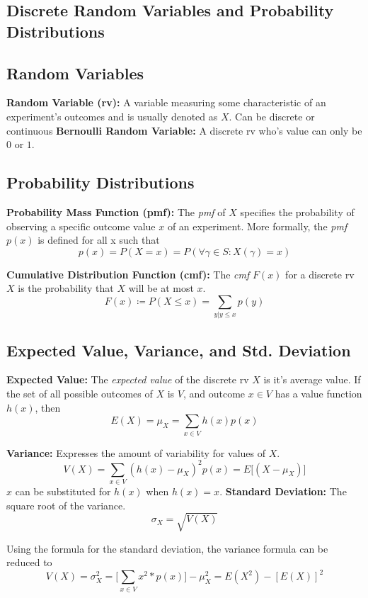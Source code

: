 \documentclass[10pt,twoside,a4paper]{article}
\begin{document}
\begin{multicols*}{2}
\begin{flushleft}
	\section{Discrete Random Variables and Probability Distributions}

	\subsection{Random Variables}
	\textbf{Random Variable (rv):} A variable measuring some characteristic of an
	experiment's outcomes and is usually denoted as $X$. Can be discrete or continuous
	\textbf{Bernoulli Random Variable:} A discrete rv who's value can only
	be $0$ or $1$.

	\subsection{Probability Distributions}
	\textbf{Probability Mass Function (pmf):} 
	The \textit{pmf} of $X$ specifies the probability of observing a specific
	outcome value $x$ of an experiment. More formally, the \textit{pmf} $p(x)$
	is defined for all x such that
	\[
		p(x) = P(X = x) = P(\forall \gamma \in S : X(\gamma) = x)
	\]

	\textbf{Cumulative Distribution Function (cmf):} The \textit{cmf} $F(x)$ for
	a discrete rv $X$ is the probability that $X$ will be at most $x$.
	\[
		F(x) \coloneqq P(X \leq x) = \sum_{y|y \leq x} p(y)
	\]

	\subsection{Expected Value, Variance, and Std. Deviation}
	\textbf{Expected Value:} The \textit{expected value} of the discrete rv $X$ is it's average
	value. If the set of all possible outcomes of $X$ is $V$, and outcome $x \in V$ has
	a value function $h(x)$, then
	$$ E(X) = \mu_X = \sum_{x \in V} h(x)p(x)$$

	\textbf{Variance:} Expresses the amount of variability for values of $X$.
	$$V(X) = \sum_{x \in V}(h(x) - \mu_X)^2 p(x) = E\big[ (X - \mu_X) \big]$$
	$x$ can be substituted for $h(x)$ when $h(x) = x$.	
	\textbf{Standard Deviation:} The square root of the variance.
	$$\sigma_X = \sqrt{V(X)}$$

	Using the formula for the standard deviation, the variance formula can be 
	reduced to
	$$V(X) = \sigma_{X}^2 = \Big[ \sum_{x \in V}x^2 * p(x) \Big] - \mu_X^2 = E(X^2) - [E(X)]^2$$


\end{flushleft}
\end{multicols*}
\end{document}
